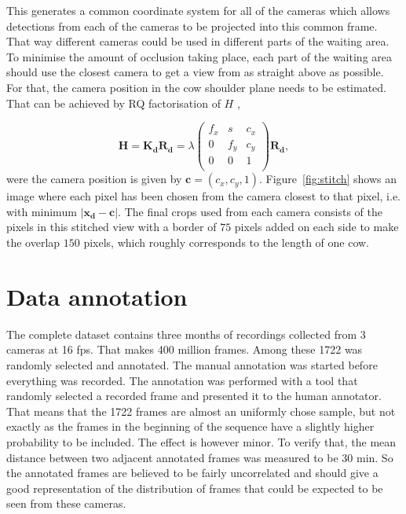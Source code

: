 \documentclass{cta-author}
\begin{document}
This generates a common coordinate system for all of the cameras which allows detections from each of the
cameras to be projected into this common frame. That way different cameras could be used in different parts
of the waiting area. To minimise the amount of occlusion taking place, each part of the waiting area should
use the closest camera to get a view from as straight above as possible. For that, the camera position in the
cow shoulder plane needs to be estimated. That can be achieved by RQ factorisation of $H$ \cite{Hartley2004},

\begin{equation}
\bm H = \bm {K_d} \bm {R_d} =
    \lambda
	\left(
	\begin{array}{ccc}
		f_x & s & c_x  \\
		0 & f_y & c_y  \\
		0 & 0 & 1  \\
	\end{array}
	\right)
	\bm {R_d} ,
\end{equation}
were the camera position is given by $\bm c = \left(c_x, c_y, 1\right)$. Figure~\ref{fig:stitch} shows an
image where each pixel has been chosen from the camera closest to that pixel, i.e. with  minimum $\left| \bm
{x_d} - \bm c \right|$. The final crops used from each camera consists of the pixels in this stitched view
with a border of $75$ pixels added on each side to make the overlap $150$ pixels, which roughly corresponds
to the length of one cow.


\section{Data annotation}

The complete dataset contains three months of recordings collected from 3 cameras at 16 fps. That makes 400
million frames. Among these 1722 was randomly selected and annotated. The manual annotation was started
before everything was recorded. The annotation was performed with a tool that randomly selected a recorded
frame and presented it to the human annotator. That means that the 1722 frames are almost an uniformly chose
sample, but not exactly as the frames in the beginning of the sequence have a slightly higher probability to
be included. The effect is however minor. To verify that,
the mean distance between two adjacent annotated frames was measured to be 30 min. So the annotated frames are
believed to be fairly uncorrelated and should give a good representation of the distribution of frames that
could be expected to be seen from these cameras.
\end{document}
